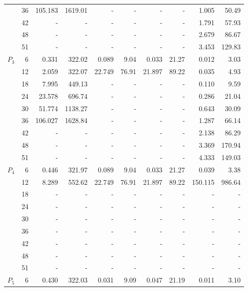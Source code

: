 \begin{table}[h!]
\begin{tabular}{| r | r | r | r | r | r | r | r | r | r |}
		{} & 36 & 105.183 & 1619.01 & - & - & - & - & 1.005 & 50.49  \\
		{} & 42 & - & - & - & - & - & - & 1.791 & 57.93  \\
		{} & 48 & - & - & - & - & - & - & 2.679 & 86.67  \\
		{} & 51 & - & - & - & - & - & - & 3.453 & 129.83  \\
		\hline
		\multirow{6}{*}{$P_3$} & 6 & 0.331 & 322.02 & 0.089 & 9.04 & 0.033 & 21.27 & 0.012 & 3.03  \\
		{} & 12 & 2.059 & 322.07 & 22.749 & 76.91 & 21.897 & 89.22 & 0.035 & 4.93  \\
		{} & 18 & 7.995 & 449.13 & - & - & - & - & 0.110 & 9.59  \\
		{} & 24 & 23.578 & 696.74 & - & - & - & - & 0.286 & 21.04  \\
		{} & 30 & 51.774 & 1138.27 & - & - & - & - & 0.643 & 30.09  \\
		{} & 36 & 106.027 & 1628.84 & - & - & - & - & 1.287 & 66.14  \\
		{} & 42 & - & - & - & - & - & - & 2.138 & 86.29  \\
		{} & 48 & - & - & - & - & - & - & 3.369 & 170.94  \\
		{} & 51 & - & - & - & - & - & - & 4.333 & 149.03  \\
		\hline
		\multirow{6}{*}{$P_4$} & 6 & 0.446 & 321.97 & 0.089 & 9.04 & 0.033 & 21.27 & 0.039 & 3.38  \\
		{} & 12 & 8.289 & 552.62 & 22.749 & 76.91 & 21.897 & 89.22 & 150.115 & 986.64  \\
		{} & 18 & - & - & - & - & - & - & - & -  \\
		{} & 24 & - & - & - & - & - & - & - & -  \\
		{} & 30 & - & - & - & - & - & - & - & -  \\
		{} & 36 & - & - & - & - & - & - & - & -  \\
		{} & 42 & - & - & - & - & - & - & - & -  \\
		{} & 48 & - & - & - & - & - & - & - & -  \\
		{} & 51 & - & - & - & - & - & - & - & -  \\
		\hline
		\multirow{6}{*}{$P_5$} & 6 & 0.430 & 322.03 & 0.031 & 9.09 & 0.047 & 21.19 & 0.011 & 3.10  \\

\end{tabular}
\end{table}
